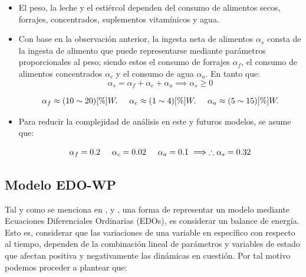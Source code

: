 \begin{itemize}
    \item El peso, la leche y el estiércol dependen del consumo de alimentos secos, forrajes, concentrados, suplementos vitamínicos y agua.
    \item Con base en la observación anterior, la ingesta neta de alimentos $\alpha_{s}$ consta de la ingesta de alimento que puede representarse mediante parámetros proporcionales al peso; siendo estos el consumo de forrajes $\alpha_{f}$, el consumo de alimentos concentrados $\alpha_{c}$ y el consumo de agua $\alpha_{a}$. En tanto que:
    \begin{equation}
        \alpha_{s} = \alpha_{f} + \alpha_{c} + \alpha_{a} \implies \alpha_{s} \geq 0
    \end{equation}

    \begin{equation*}
        \alpha_{f} \approx (10\sim 20)[\%]W. \hspace{0.5cm} \alpha_{c} \approx (1\sim 4)[\%]W. \hspace{0.5cm} \alpha_{a} \approx (5\sim 15)[\%]W.
    \end{equation*}

    \item Para reducir la complejidad de análisis en este y futuros modelos, se asume que:

    \begin{equation*}
       \alpha_{f} = 0.2 \hspace{0.5cm} \alpha_{c} = 0.02 \hspace{0.5cm} \alpha_{a} = 0.1 \implies \therefore \alpha_{s} = 0.32
    \end{equation*}

\end{itemize}

\subsection{Modelo EDO-WP} \label{edosec}

Tal y como se menciona en \cite{shanks}, \cite{silvestre} y \cite{iran}, una forma de representar un modelo mediante Ecuaciones Diferenciales Ordinarias (EDOs), es considerar un balance de energía. Esto es, considerar que las variaciones de una variable en específico con respecto al tiempo, dependen de la combinación lineal de parámetros y variables de estado que afectan positiva y negativamente las dinámicas en cuestión. Por tal motivo podemos proceder a plantear que:

